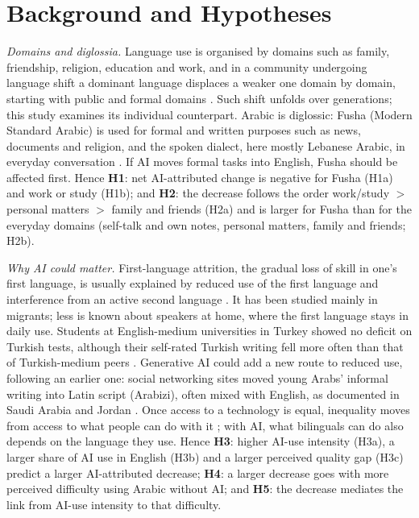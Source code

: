 \documentclass[conference]{IEEEtran}
\begin{document}
\section{Background and Hypotheses}

\emph{Domains and diglossia.} Language use is organised by domains such as family, friendship, religion, education and work, and in a community undergoing language shift a dominant language displaces a weaker one domain by domain, starting with public and formal domains \cite{fishman1965,fishman1972}. Such shift unfolds over generations; this study examines its individual counterpart. Arabic is diglossic: Fusha (Modern Standard Arabic) is used for formal and written purposes such as news, documents and religion, and the spoken dialect, here mostly Lebanese Arabic, in everyday conversation \cite{ferguson1959}. If AI moves formal tasks into English, Fusha should be affected first. Hence \textbf{H1}: net AI-attributed change is negative for Fusha (H1a) and work or study (H1b); and \textbf{H2}: the decrease follows the order work/study $>$ personal matters $>$ family and friends (H2a) and is larger for Fusha than for the everyday domains (self-talk and own notes, personal matters, family and friends; H2b).

\emph{Why AI could matter.} First-language attrition, the gradual loss of skill in one's first language, is usually explained by reduced use of the first language and interference from an active second language \cite{chaouch2025,gallo2025}. It has been studied mainly in migrants; less is known about speakers at home, where the first language stays in daily use. Students at English-medium universities in Turkey showed no deficit on Turkish tests, although their self-rated Turkish writing fell more often than that of Turkish-medium peers \cite{aycicegi2015}. Generative AI could add a new route to reduced use, following an earlier one: social networking sites moved young Arabs' informal writing into Latin script (Arabizi), often mixed with English, as documented in Saudi Arabia and Jordan \cite{alghamdi2018,bianchi2012}. Once access to a technology is equal, inequality moves from access to what people can do with it \cite{hargittai2002}; with AI, what bilinguals can do also depends on the language they use. Hence \textbf{H3}: higher AI-use intensity (H3a), a larger share of AI use in English (H3b) and a larger perceived quality gap (H3c) predict a larger AI-attributed decrease; \textbf{H4}: a larger decrease goes with more perceived difficulty using Arabic without AI; and \textbf{H5}: the decrease mediates the link from AI-use intensity to that difficulty.
\end{document}
